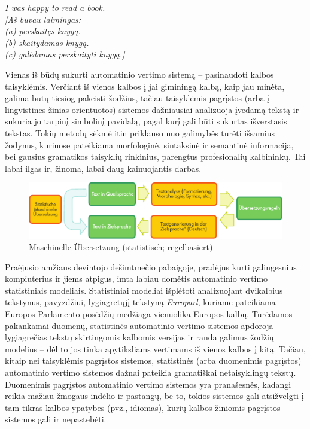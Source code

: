 \documentclass[]{../metanetpaper}
\begin{document}
\begin{multicols}{2}
 \textit{I was happy to read a book.\\
      {[}Aš buvau laimingas:{}\\
      {}(a) perskaitęs knygą.{}\\
      {}(b) skaitydamas knygą.{}\\
      {}(c) galėdamas perskaityti knygą.{]} }     

Vienas iš būdų sukurti automatinio vertimo sistemą – pasinaudoti kalbos taisyklėmis. Verčiant iš vienos kalbos į jai giminingą kalbą, kaip jau minėta, galima būtų tiesiog pakeisti žodžius, tačiau taisyklėmis pagrįstos (arba į lingvistines žinias orientuotos) sistemos dažniausiai analizuoja įvedamą tekstą ir sukuria jo tarpinį simbolinį pavidalą, pagal kurį gali būti sukurtas išverstasis tekstas. Tokių metodų sėkmė itin priklauso nuo galimybės turėti išsamius žodynus, kuriuose pateikiama morfologinė, sintaksinė ir semantinė informacija, bei gausius gramatikos taisyklių rinkinius, parengtus profesionalių kalbininkų. Tai labai ilgas ir, žinoma, labai daug kainuojantis darbas.

\begin{figure}[htb]
  \center
  \includegraphics[width=\textwidth]{../_media/german/machine_translation}
  \caption{Maschinelle Übersetzung (statistisch; regelbasiert)}
  \label{fig:mtarch_de}
\end{figure}

 Praėjusio amžiaus devintojo dešimtmečio pabaigoje, pradėjus kurti galingesnius kompiuterius ir jiems atpigus, imta labiau domėtis automatinio vertimo statistiniais modeliais. Statistiniai modeliai išplėtoti analizuojant dvikalbius tekstynus, pavyzdžiui, lygiagretųjį tekstyną \textit{Europarl}, kuriame pateikiama Europos Parlamento posėdžių medžiaga vienuolika Europos kalbų. Turėdamos pakankamai duomenų, statistinės automatinio vertimo sistemos apdoroja lygiagrečias tekstų skirtingomis kalbomis versijas ir randa galimus žodžių modelius – dėl to jos tinka apytiksliams vertimams iš vienos kalbos į kitą. Tačiau, kitaip nei taisyklėmis pagrįstos sistemos, statistinės (arba duomenimis pagrįstos) automatinio vertimo sistemos dažnai pateikia gramatiškai netaisyklingų tekstų. Duomenimis pagrįstos automatinio vertimo sistemos yra pranašesnės, kadangi reikia mažiau žmogaus indėlio ir pastangų, be to, tokios sistemos gali atsižvelgti į tam tikras kalbos ypatybes (pvz., idiomas), kurių kalbos žiniomis pagrįstos sistemos gali ir nepastebėti.    


\end{multicols}
\end{document}
